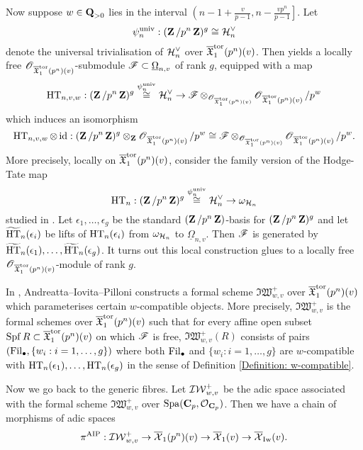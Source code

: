 Now suppose $w\in \Q_{>0}$ lies in the interval $\left(n-1+\frac{v}{p-1}, n-\frac{vp^n}{p-1}\right]$. Let $$\psi_n^{\univ}: (\Z/p^n\Z)^g\cong \calH_n^{\vee}$$ denote the universal trivialisation of $\calH_n^{\vee}$ over $\overline{\frakX}^{\tor}_1(p^n)(v)$. Then \cite[Proposition 4.3.1]{AIP-2015} yields a locally free $\scrO_{\overline{\frakX}^{\tor}_1(p^n)(v)}$-submodule $\scrF\subset \underline{\Omega}_{n,v}$ of rank $g$, equipped with a map
$$\HT_{n,v,w}:  (\Z/p^n\Z)^g\overset{\psi_n^{\univ}}{\cong} \calH_n^{\vee}\rightarrow \scrF\otimes_{\scrO_{\overline{\frakX}_1^{\tor}(p^n)(v)}}\scrO_{\overline{\frakX}_1^{\tor}(p^n)(v)}/p^w$$
which induces an isomorphism
$$\HT_{n,v,w}\otimes\id: (\Z/p^n\Z)^g\otimes_{\Z}\scrO_{\overline{\frakX}_1^{\tor}(p^n)(v)}/p^w\cong \scrF\otimes_{\scrO_{\overline{\frakX}_1^{\tor}(p^n)(v)}}\scrO_{\overline{\frakX}_1^{\tor}(p^n)(v)}/p^w.$$
More precisely, locally on $\overline{\frakX}_1^{\tor}(p^n)(v)$, consider the family version of the Hodge-Tate map 
$$\HT_n: (\Z/p^n\Z)^g\overset{\psi_n^{\univ}}{\cong}\calH_n^{\vee}\rightarrow \omega_{\calH_n}$$
studied in \cite[\S 4]{AIP-2015}. Let $\epsilon_1, \ldots, \epsilon_g$ be the standard $(\Z/p^n\Z)$-basis for $(\Z/p^n\Z)^g$ and let $\widetilde{\HT}_n(\epsilon_i)$ be lifts of $\HT_n(\epsilon_i)$ from $\omega_{\calH_n}$ to $\underline{\Omega}_{n,v}$. Then $\scrF$ is generated by $\widetilde{\HT}_n(\epsilon_1), \ldots, \widetilde{\HT}_n(\epsilon_g)$. It turns out this local construction glues to a locally free $\scrO_{\overline{\frakX}^{\tor}_1(p^n)(v)}$-module of rank $g$.

In \cite[\S 4.5]{AIS-2015}, Andreatta--Iovita--Pilloni constructs a formal scheme $\mathfrak{IW}^+_{w,v}$ over $\overline{\frakX}^{\tor}_1(p^n)(v)$ which parameterises certain $w$-compatible objects. More precisely, $\mathfrak{IW}^+_{w,v}$ is the formal schemes over $\overline{\frakX}^{\tor}_1(p^n)(v)$ such that for every affine open subset $\Spf R\subset \overline{\frakX}^{\tor}_1(p^n)(v)$ on which $\scrF$ is free, $\mathfrak{IW}^+_{w,v}(R)$ consists of pairs $(\Fil_{\bullet}, \{w_i: i=1,\ldots, g\})$ where both $\Fil_{\bullet}$ and $\{w_i: i=1, \ldots, g\}$ are $w$-compatible with $\HT_n(\epsilon_1), \ldots, \HT_n(\epsilon_g)$ in the sense of Definition \ref{Definition: w-compatible}.

Now we go back to the generic fibres. Let $\adicIW_{w,v}^+$ be the adic space associated with the formal scheme $\mathfrak{IW}^+_{w,v}$ over $\Spa(\C_p, \calO_{\C_p})$. Then we have a chain of morphisms of adic spaces
$$\pi^{\AIP}: \adicIW_{w,v}^+\rightarrow \overline{\calX}_1(p^n)(v)\rightarrow\overline{\calX}_1(v)\rightarrow \overline{\calX}_{\Iw}(v).$$

